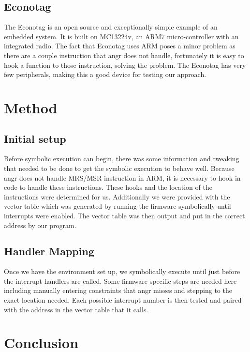 \documentclass[letterpaper, 10 pt, conference]{ieeeconf}
\begin{document}

\subsection{Econotag} \label{etag}%
The Econotag \cite{etag} is an open source and exceptionally simple example of an embedded system. It is built on MC13224v, an ARM7 micro-controller with an integrated radio. The fact that Econotag uses ARM poses a minor problem as there are a couple instruction that angr does not handle, fortunately it is easy to hook a function to those instruction, solving the problem. The Econotag has very few peripherals, making this a good device for testing our approach.

\section{Method} \label{mthd}
\subsection{Initial setup} \label{stup}
Before symbolic execution can begin, there was some information and tweaking that needed to be done to get the symbolic execution to behave well. Because angr does not handle MRS/MSR instruction in ARM, it is necessary to hook in code to handle these instructions. These hooks and the location of the instructions were determined for us. Additionally we were provided with the vector table which was generated by running the firmware symbolically until interrupts were enabled. %
The vector table was then output and put in the correct address by our program. 

\subsection{Handler Mapping} \label{hmap}
Once we have the environment set up, we symbolically execute until just before the interrupt handlers are called. Some firmware specific steps are needed here including manually entering constraints that angr misses and stepping to the exact location needed. Each possible interrupt number is then tested and paired with the address in the vector table that it calls.

\section{Conclusion} \label{conc}
\end{document}
